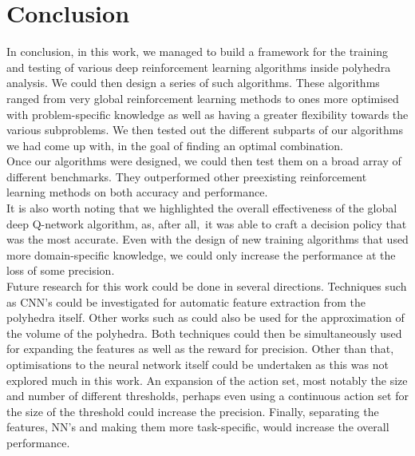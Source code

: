 \chapter{Conclusion}
In conclusion, in this work, we managed to build a framework for the training and testing of various deep reinforcement learning algorithms inside polyhedra analysis. We could then design a series of such algorithms. These algorithms ranged from very global reinforcement learning methods to ones more optimised with problem-specific knowledge as well as having a greater flexibility towards the various subproblems. We then tested out the different subparts of our algorithms we had come up with, in the goal of finding an optimal combination.\\
Once our algorithms were designed, we could then test them on a broad array of different benchmarks. They outperformed other preexisting reinforcement learning methods on both accuracy and performance.\\
It is also worth noting that we highlighted the overall effectiveness of the global deep Q-network algorithm, as, after all, it was able to craft a decision policy that was the most accurate. Even with the design of new training algorithms that used more domain-specific knowledge, we could only increase the performance at the loss of some precision.\\
Future research for this work could be done in several directions. Techniques such as CNN's could be investigated for automatic feature extraction from the polyhedra itself. Other works such as \cite{dyer1991random, kim2004fast} could also be used for the approximation of the volume of the polyhedra. Both techniques could then be simultaneously used for expanding the features as well as the reward for precision. Other than that, optimisations to the neural network itself could be undertaken as this was not explored much in this work. An expansion of the action set, most notably the size and number of different thresholds, perhaps even using a continuous action set for the size of the threshold could increase the precision. Finally, separating the features, NN's and making them more task-specific, would increase the overall performance.